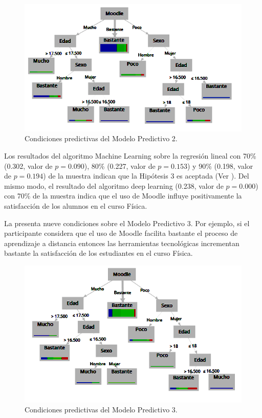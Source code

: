 \documentclass[spanish]{textolivre}
\begin{document}
\begin{figure}[htbp]
\centering
\begin{minipage}{.85\textwidth}
 \includegraphics[width=\textwidth]{Image6.png}
 \caption{Condiciones predictivas del Modelo Predictivo 2.}
 \label{fig06}
\end{minipage}
\end{figure}

Los resultados del algoritmo Machine Learning sobre la regresión lineal con 70\% (0.302, valor de $p = 0.090$), 80\% (0.227, valor de $p = 0.153$) y 90\% (0.198, valor de $p = 0.194$) de la muestra indican que la Hipótesis 3 es aceptada (Ver ). Del mismo modo, el resultado del algoritmo deep learning (0.238, valor de $p = 0.000$) con 70\% de la muestra indica que el uso de Moodle influye positivamente la satisfacción de los alumnos en el curso Física.

La  presenta nueve condiciones sobre el Modelo Predictivo 3. Por ejemplo, si el participante considera que el uso de Moodle facilita bastante el proceso de aprendizaje a distancia entonces las herramientas tecnológicas incrementan bastante la satisfacción de los estudiantes en el curso Física.

\begin{figure}[htbp]
\centering
\begin{minipage}{.85\textwidth}
 \includegraphics[width=\textwidth]{Image7.png}
 \caption{Condiciones predictivas del Modelo Predictivo 3.}
 \label{fig07}
\end{minipage}
\end{figure}
\end{document}
